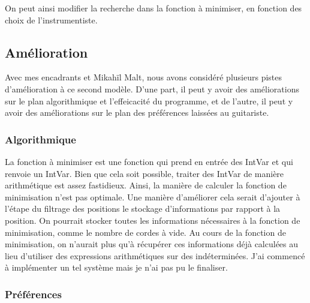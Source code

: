 On peut ainsi modifier la recherche dans la fonction à minimiser, en fonction
des choix de l'instrumentiste.

\subsection{Amélioration}
\label{subsec:amelioration}

Avec mes encadrants et Mikahïl Malt, nous avons considéré plusieurs pistes 
d'amélioration à ce second modèle. D'une part, il peut y avoir des 
améliorations sur le plan algorithmique et l'effeicacité du programme, et de
l'autre, il peut y avoir des améliorations sur le plan des préférences laissées
au guitariste.

\subsubsection{Algorithmique}
\label{subsubsec:Algorithmique}

La fonction à minimiser est une fonction qui prend en entrée des IntVar et qui
renvoie un IntVar. Bien que cela soit possible, traiter des IntVar de manière
arithmétique est assez fastidieux. 
Ainsi, la manière de calculer la fonction de minimisation n'est pas optimale.
Une manière d'améliorer cela serait d'ajouter à l'étape du filtrage des
positions le stockage d'informations par rapport à la position. 
On pourrait stocker toutes les informations nécessaires à la fonction de 
minimisation, comme le nombre de cordes à vide.
Au cours de la fonction de minimisation, on n'aurait plus qu'à récupérer ces 
informations déjà calculées au lieu d'utiliser des expressions arithmétiques
sur des indéterminées.
J'ai commencé à implémenter un tel système mais je n'ai pas pu le finaliser.

\subsubsection{Préférences}
\label{subsubsection:Preferences}


